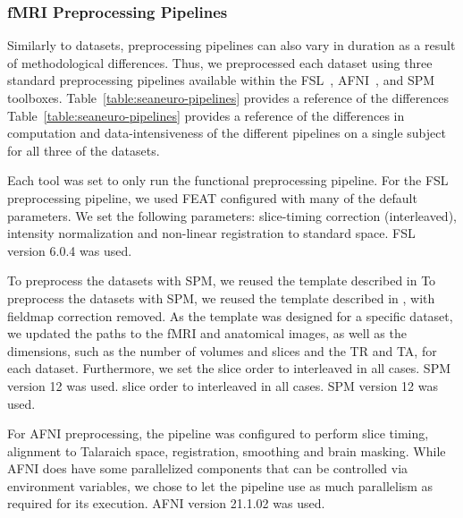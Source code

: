\documentclass[fleqn,10pt]{wlscirep}
\begin{document}
    
    
    \subsubsection{fMRI Preprocessing Pipelines}
    
    Similarly to datasets, preprocessing pipelines can also vary in duration as
    a result of methodological differences. Thus, we preprocessed each dataset
    using three standard preprocessing pipelines available within the FSL~\cite{fsl},
    AFNI~\cite{cox1996afni}, and SPM~\cite{spm} toolboxes.
    Table~\ref{table:seaneuro-pipelines} provides a reference of the differences
    Table~\ref{table:seaneuro-pipelines} provides a reference of the differences
    in computation and data-intensiveness of the different pipelines on a single
    subject for all three of the datasets.
    
    Each tool was set to only run the functional preprocessing pipeline. For the FSL preprocessing pipeline, 
    we used FEAT configured with many of
    the default parameters. We set the following parameters: slice-timing
    correction (interleaved), intensity normalization and non-linear
    registration to standard space. FSL version 6.0.4 was used.
    
    To preprocess the datasets with SPM, we reused the template described in
    To preprocess the datasets with SPM, we reused the template described in
    \cite{haitas2021age}, with fieldmap correction removed. As the template was
    designed for a specific dataset, we updated the paths to the fMRI and
    anatomical images, as well as the dimensions, such as the number of volumes
    and slices and the TR and TA, for each dataset. Furthermore, we set the
    slice order to interleaved in all cases. SPM version 12 was used.
    slice order to interleaved in all cases. SPM version 12 was used.
    
    For AFNI preprocessing, the pipeline was configured to perform slice timing,
    alignment to Talaraich space, registration, smoothing and brain masking.
    While AFNI does have some parallelized components that can be controlled via
    environment variables, we chose to let the pipeline use as much parallelism
    as required for its execution. AFNI version 21.1.02 was used.
\end{document}

